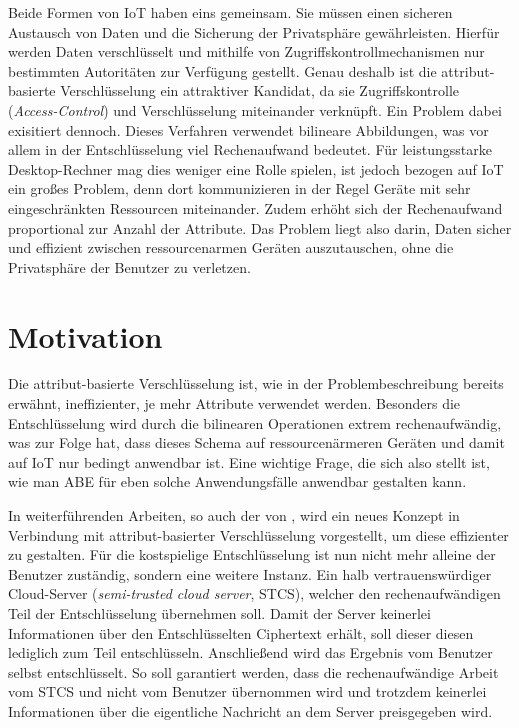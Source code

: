 \documentclass[format=sigconf]{acmart}
\begin{document}
	Beide Formen von IoT haben eins gemeinsam. Sie müssen einen sicheren Austausch
	von Daten und die Sicherung der Privatsphäre gewährleisten. Hierfür werden
	Daten verschlüsselt und mithilfe von Zugriffskontrollmechanismen nur
	bestimmten Autoritäten zur Verfügung gestellt. Genau deshalb ist die
	attribut-basierte Verschlüsselung ein attraktiver Kandidat, da sie
	Zugriffskontrolle (\textit{Access-Control}) und Verschlüsselung miteinander
	verknüpft. Ein Problem dabei exisitiert dennoch. Dieses Verfahren verwendet
	bilineare Abbildungen, was vor allem in der Entschlüsselung viel Rechenaufwand
	bedeutet. Für leistungsstarke Desktop-Rechner mag dies weniger eine Rolle
	spielen, ist jedoch bezogen auf IoT ein großes Problem, denn dort
	kommunizieren in der Regel Geräte mit sehr eingeschränkten Ressourcen
	miteinander. Zudem erhöht sich der Rechenaufwand proportional zur Anzahl
	der Attribute. Das Problem liegt also darin, Daten sicher und effizient
	zwischen ressourcenarmen Geräten auszutauschen, ohne die Privatsphäre der
	Benutzer zu verletzen.

	\section{Motivation}
	Die attribut-basierte Verschlüsselung ist, wie in der Problembeschreibung
	bereits erwähnt, ineffizienter, je mehr Attribute verwendet werden. Besonders
	die Entschlüsselung wird durch die bilinearen Operationen extrem
	rechenaufwändig, was zur Folge hat, dass dieses Schema auf ressourcenärmeren
	Geräten und damit auf IoT nur bedingt anwendbar ist. Eine wichtige Frage, die
	sich also stellt ist, wie man ABE für eben solche Anwendungsfälle anwendbar
	gestalten kann.

	In weiterführenden Arbeiten, so auch der von \cite{green}, wird ein neues
	Konzept in Verbindung mit attribut-basierter Verschlüsselung vorgestellt, um
	diese effizienter zu gestalten. Für die kostspielige Entschlüsselung ist nun
	nicht mehr alleine der Benutzer zuständig, sondern eine weitere Instanz. Ein
	halb vertrauenswürdiger Cloud-Server (\textit{semi-trusted cloud server},
	STCS), welcher den rechenaufwändigen Teil der Entschlüsselung übernehmen
	soll. Damit der Server keinerlei Informationen über den Entschlüsselten
	Ciphertext erhält, soll dieser diesen lediglich zum Teil entschlüsseln.
	Anschließend wird das Ergebnis vom Benutzer selbst entschlüsselt. So soll
	garantiert werden, dass die rechenaufwändige Arbeit vom STCS und nicht vom
	Benutzer übernommen wird und trotzdem keinerlei Informationen über die
	eigentliche Nachricht an dem Server preisgegeben wird.
\end{document}
